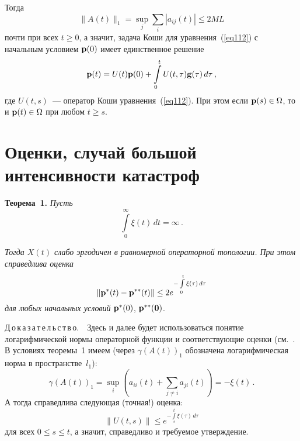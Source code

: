 \begin{multicols}{2}
Тогда
\begin{equation*}
\|A(t)\|_1  = \sup_{j}\sum_i|a_{ij}(t)| \le 2M L  
\end{equation*}
почти при всех $t \ge 0$, а значит, задача Коши для
уравнения~(\ref{eq112}) с начальным условием ${\mathbf p}(0)$ имеет
единственное решение
\begin{equation*}
{\bf p}(t) =  U(t){\bf p}(0) + \int\limits_0^t U(t,\tau){\bf
g}(\tau)\, d\tau \,, 
\end{equation*}
где $U(t,s)$~--- оператор Коши уравнения~(\ref{eq112}). При
этом если ${\bf p}(s) \in \Omega$, то и ${\bf p}(t) \in \Omega$ при
любом  $t \ge s$.

\section{Оценки, случай большой интенсивности катастроф}

\smallskip

\noindent
\textbf{Теорема~1.} \textit{Пусть}
\begin{equation}
\int\limits_0^\infty \xi(t)\, dt = \infty\,. 
\label{cat01}
\end{equation}

\textit{Тогда $X(t)$ слабо эргодичен в равномерной операторной топологии. При этом справедлива оценка}
\begin{equation*}
\|{\bf p^*}(t) - {\bf p^{**}}(t)\| \le 2 e^{- \int\limits_0^t
\xi(\tau)\, d\tau} 
\end{equation*}
\textit{для любых начальных условий} ${\bf p^*}(0)$, ${\bf
p^{**}(0)}$.

\smallskip


\noindent
Д\,о\,к\,а\,з\,а\,т\,е\,л\,ь\,с\,т\,в\,о.\ \, Здесь и далее будет использоваться понятие
логарифмической нормы операторной функции и соответствующие оценки
(см.~\cite{z06, gz04}. В условиях теоремы~1 имеем (через
$\gamma \left(A(t)\right)_{1}$ обозначена логарифмическая норма в
пространстве~$l_1$):
\begin{equation*}
\gamma \left(A(t)\right)_{1} = \sup_i \left(a_{ii}(t) + \sum_{j\neq
i} a_{ji}(t)\right) = -\xi(t)\,.
\end{equation*}
А тогда справедлива следующая (точная!) оценка:
\begin{equation*}
\|U(t,s)\| \le  e^{-\int\limits_s^t \xi(\tau)\, d\tau}
\end{equation*}
для всех $0 \le s \le t$, а значит, справедливо и требу\-емое утверждение.


\end{multicols}
